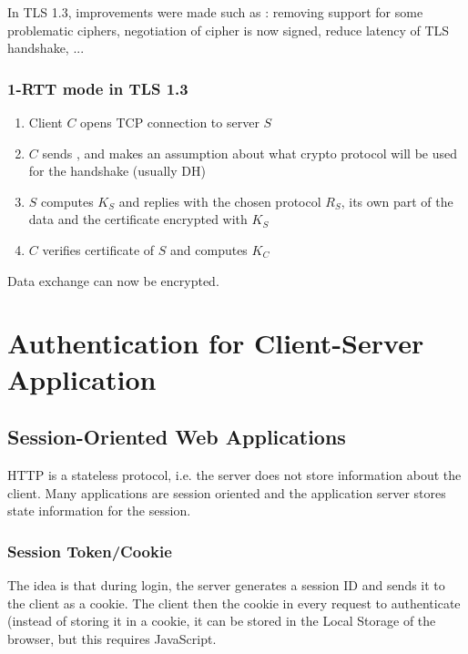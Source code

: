 In TLS 1.3, improvements were made such as : removing support for some problematic ciphers, negotiation of cipher is now signed, reduce latency of TLS handshake, ...

\subsection{1-RTT mode in TLS 1.3}

\begin{enumerate}
    \item Client $C$ opens TCP connection to server $S$
    \item $C$ sends , and makes an assumption about what crypto protocol will be used for the handshake (usually DH)
    \item $S$ computes $K_S$ and replies with the chosen protocol $R_S$, its own part of the data and the certificate encrypted with $K_S$
    \item $C$ verifies certificate of $S$ and computes $K_C$
\end{enumerate}

Data exchange can now be encrypted.

\chapter{Authentication for Client-Server Application}

\section{Session-Oriented Web Applications}

HTTP is a stateless protocol, i.e. the server does not store information about the client. Many applications are session oriented and the application server stores state information for the session.

\subsection{Session Token/Cookie}

The idea is that during login, the server generates a session ID and sends it to
the client as a cookie. The client then the cookie in every request to authenticate (instead of storing it in a cookie, it can be stored in the Local Storage of the browser, but this requires JavaScript.

